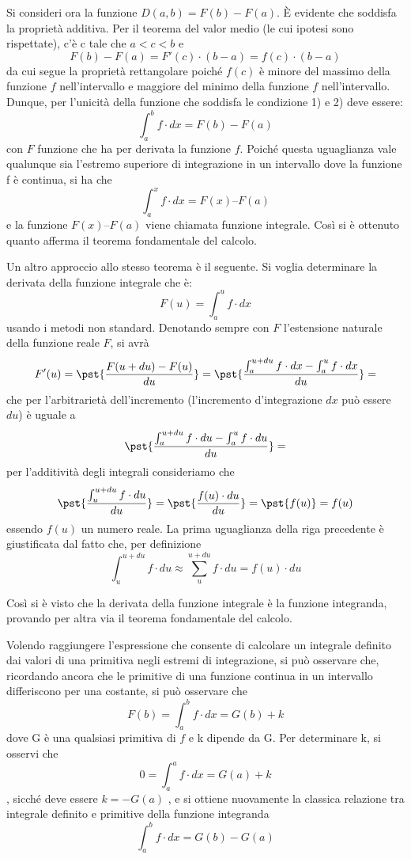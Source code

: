 Si consideri ora la funzione 
\(D(a,b) = F(b)-F(a)\). 
È evidente che soddisfa la proprietà additiva. Per il teorema 
del valor medio (le cui ipotesi sono rispettate), c'è c tale che 
\(a < c < b\) 
e 
\[F(b)-F(a) = F'(c)\cdot(b - a) = f(c)\cdot(b - a)\]
da cui segue la proprietà rettangolare poiché \(f(c)\) è minore del massimo 
della funzione \(f\) 
nell'intervallo e maggiore del minimo della funzione \(f\) nell'intervallo.
Dunque, 
per l'unicità della funzione che soddisfa le condizione 1) e 2) deve essere:
\[\int_a^b f \cdot dx = F(b)-F(a)\]
con \(F\) funzione che ha per derivata la funzione \(f\). 
Poiché questa uguaglianza vale qualunque sia l'estremo superiore di 
integrazione in un intervallo dove la funzione f è continua, si ha che
\[\int_a^x f \cdot dx = F(x) – F(a)\]
e la funzione \(F(x) – F(a)\) viene chiamata funzione integrale.
Così si è ottenuto quanto afferma il teorema fondamentale del
calcolo.

Un altro approccio allo stesso teorema è il seguente.
Si voglia determinare la derivata della funzione integrale che è: 
\[F(u) = \int_a^u f \cdot dx\]
usando i metodi non standard. Denotando sempre con \(F\) l'estensione 
naturale della funzione reale \(F\), si avrà
\[F'(u) = \pst{\frac{F(u+du)-F(u)}{du}} = 
\pst{\frac{\int_a^{u+du} f \cdot dx - \int_a^u f \cdot dx}{du}} =\] 
che per l'arbitrarietà dell'incremento (l'incremento d'integrazione \(dx\) 
può essere \(du\)) è uguale a
\[\pst{\frac{\int_a^{u+du} f \cdot du - \int_a^u f \cdot du}{du}} =\]
per l'additività degli integrali consideriamo che
\[\pst{\frac{\int_u^{u+du} f \cdot du}{du}} = 
    \pst{\frac{f(u) \cdot du}{du}} = \pst{f(u)} = f(u)\]
essendo \(f(u)\) un numero reale. La prima uguaglianza della riga
precedente è giustificata dal fatto che, per definizione 
\[\int_u^{u+du} f \cdot du \approx \sum_u^{u+du} f \cdot du = 
  f(u) \cdot du\]

 Così si è visto che la derivata della funzione integrale è la funzione 
integranda, provando per altra via il teorema fondamentale del calcolo.

Volendo raggiungere l'espressione che consente di calcolare un integrale 
definito dai valori di una primitiva negli estremi di integrazione, si può 
osservare che, ricordando ancora che le primitive di una funzione continua in 
un intervallo differiscono per una costante, si può osservare che
\[F(b) = \int_a^b f \cdot dx = G(b) + k\]
dove G è una qualsiasi primitiva di \(f\) e k dipende da G. Per determinare k, 
si 
osservi che
\[0 = \int_a^a f \cdot dx = G(a) + k\],
sicché deve essere \(k = - G(a)\) , e si ottiene nuovamente la classica 
relazione 
tra integrale definito e primitive della funzione integranda 
\[\int_a^b f \cdot dx = G(b) - G(a)\]

